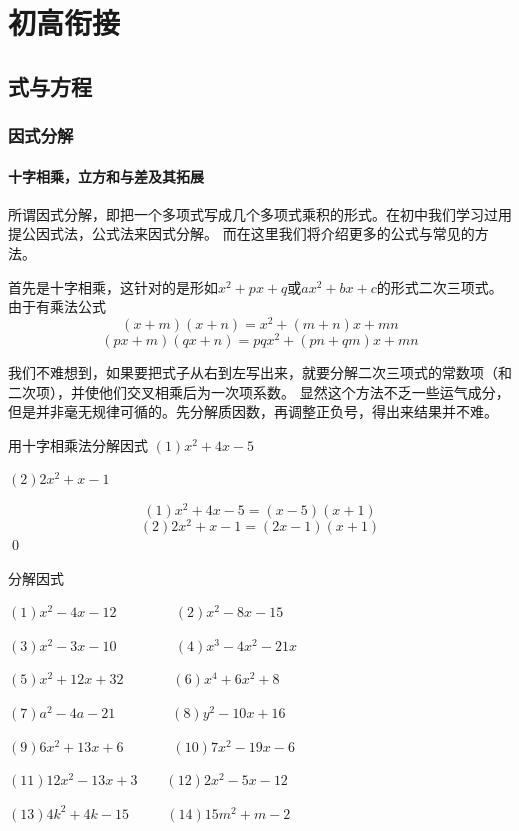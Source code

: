 \part{初高衔接}
\chapter{式与方程}

\section{因式分解}
\subsection{十字相乘，立方和与差及其拓展}
所谓因式分解，即把一个多项式写成几个多项式乘积的形式。在初中我们学习过用提公因式法，公式法来因式分解。
而在这里我们将介绍更多的公式与常见的方法。

首先是十字相乘，这针对的是形如$x^2+px+q$或$ax^2+bx+c$的形式二次三项式。由于有乘法公式
\[(x+m)(x+n)=x^2+(m+n)x+mn\]
\[(px+m)(qx+n)=pqx^2+(pn+qm)x+mn\]

我们不难想到，如果要把式子从右到左写出来，就要分解二次三项式的常数项（和二次项），并使他们交叉相乘后为一次项系数。
显然这个方法不乏一些运气成分，但是并非毫无规律可循的。先分解质因数，再调整正负号，得出来结果并不难。
\begin{example}
用十字相乘法分解因式
 $(1)x^2+4x-5$

 $(2)2x^2+x-1$
\end{example}
\begin{jie}
    
\[(1)x^2+4x-5=(x-5)(x+1)\]
\[(2)2x^2+x-1=(2x-1)(x+1)\]
\qed 
\end{jie}

\begin{exercise}
\label{exercise1.1.1}
    分解因式
\par$(1)x^2-4x-12$\qquad\ \ \ \ \ \ \ \ \,$(2)x^2-8x-15$
\par$(3)x^2-3x-10$\qquad\ \ \ \ \ \ \ \ \,$(4)x^3-4x^2-21x$
\par$(5)x^2+12x+32$\qquad\ \ \ \ \ \ \ $(6)x^4+6x^2+8$
\par$(7)a^2-4a-21$\qquad\ \ \ \ \ \ \ \, $(8)y^2-10x+16$
\par$(9)6x^2+13x+6$\qquad\ \ \ \ \ \ \ $(10)7x^2-19x-6$
\par$(11)12x^2-13x+3$\qquad\ \ \ \ $(12)2x^2-5x-12$
\par$(13)4k^2+4k-15$\qquad\ \ \ \ \ \,$(14)15m^2+m-2$

\end{exercise}

